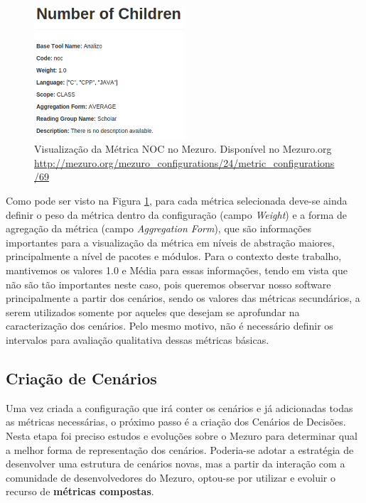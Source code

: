\graphicspath{{figuras/}}
\begin{figure}[h]
\centering
\includegraphics[width=0.5\textwidth]{metric_example}
\caption{Visualização da Métrica NOC no Mezuro. Disponível no Mezuro.org \url{http://mezuro.org/mezuro_configurations/24/metric_configurations/69}}
\label{metric_example}
\end{figure}

Como pode ser visto na Figura \ref{metric_example}, para cada métrica selecionada deve-se ainda definir o peso da métrica dentro da configuração (campo \emph{Weight}) e a forma de agregação da métrica (campo \emph{Aggregation Form}), que são informações importantes para a visualização da métrica em níveis de abstração maiores, principalmente a nível de pacotes e módulos. Para o contexto deste trabalho, mantivemos os valores 1.0 e Média para essas informações, tendo em vista que não são tão importantes neste caso, pois queremos observar nosso software principalmente a partir dos cenários, sendo os valores das métricas secundários, a serem utilizados somente por aqueles que desejam se aprofundar na caracterização dos cenários. Pelo mesmo motivo, não é necessário definir os intervalos para avaliação qualitativa dessas métricas básicas.

\subsection{Criação de Cenários}

Uma vez criada a configuração que irá conter os cenários e já adicionadas todas as métricas necessárias, o próximo passo é a criação dos Cenários de Decisões. Nesta etapa foi preciso estudos e evoluções sobre o Mezuro para determinar qual a melhor forma de representação dos cenários. Poderia-se adotar a estratégia de desenvolver uma estrutura de cenários novas, mas a partir da interação com a comunidade de desenvolvedores do Mezuro, optou-se por utilizar e evoluir o recurso de \textbf{métricas compostas}.

